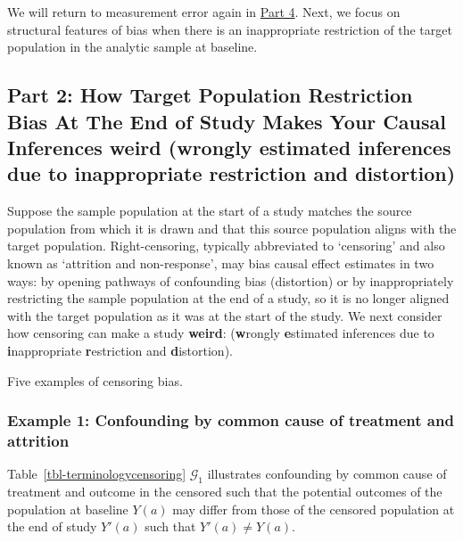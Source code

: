 \documentclass[
  single column]{article}
\begin{document}
We will return to measurement error again in \hyperref[id-sec-4]{Part
4}. Next, we focus on structural features of bias when there is an
inappropriate restriction of the target population in the analytic
sample at baseline.

\subsection{\texorpdfstring{Part 2: How Target Population Restriction
Bias At The End of Study Makes Your Causal Inferences weird
(\textbf{w}rongly \textbf{e}stimated inferences due to
\textbf{i}nappropriate \textbf{r}estriction and
\textbf{d}istortion)}{Part 2: How Target Population Restriction Bias At The End of Study Makes Your Causal Inferences weird (wrongly estimated inferences due to inappropriate restriction and distortion)}}\label{id-sec-2}

Suppose the sample population at the start of a study matches the source
population from which it is drawn and that this source population aligns
with the target population. Right-censoring, typically abbreviated to
`censoring' and also known as `attrition and non-response', may bias
causal effect estimates in two ways: by opening pathways of confounding
bias (distortion) or by inappropriately restricting the sample
population at the end of a study, so it is no longer aligned with the
target population as it was at the start of the study. We next consider
how censoring can make a study \textbf{weird}: (\textbf{w}rongly
\textbf{e}stimated inferences due to \textbf{i}nappropriate
\textbf{r}estriction and \textbf{d}istortion).

\begin{table}

\caption{\label{tbl-terminologycensoring}Five examples of censoring
bias.}

\centering{

\terminologycensoring

}

\end{table}%

\subsubsection{Example 1: Confounding by common cause of treatment and
attrition}\label{example-1-confounding-by-common-cause-of-treatment-and-attrition}

Table~\ref{tbl-terminologycensoring} \(\mathcal{G}_1\) illustrates
confounding by common cause of treatment and outcome in the censored
such that the potential outcomes of the population at baseline \(Y(a)\)
may differ from those of the censored population at the end of study
\(Y'(a)\) such that \(Y'(a) \neq Y(a)\).
\end{document}
